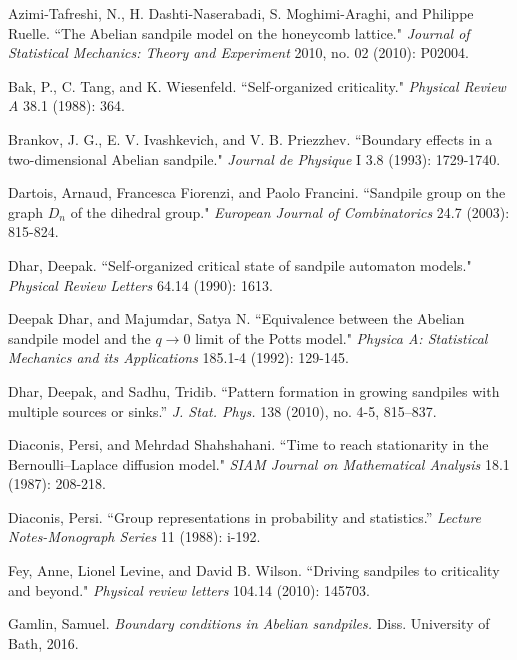 \documentclass[a4paper, 12pt, notitlepage]{amsart}
\theoremstyle{remark}
\begin{document}

\begin{thebibliography}{1}

Azimi-Tafreshi, N., H. Dashti-Naserabadi, S. Moghimi-Araghi, and Philippe Ruelle. 
\newblock ``The Abelian sandpile model on the honeycomb lattice." 
\newblock \emph{Journal of Statistical Mechanics: Theory and Experiment} 2010, no. 02 (2010): P02004.

Bak, P., C. Tang, and K. Wiesenfeld. 
\newblock ``Self-organized criticality." 
\newblock \emph{Physical Review A} 38.1 (1988): 364.

Brankov, J. G., E. V. Ivashkevich, and V. B. Priezzhev. 
\newblock ``Boundary effects in a two-dimensional Abelian sandpile." 
\newblock \emph{Journal de Physique} I 3.8 (1993): 1729-1740.

Dartois, Arnaud, Francesca Fiorenzi, and Paolo Francini.
\newblock ``Sandpile group on the graph $D_n$ of the dihedral group." 
\newblock \emph{European Journal of Combinatorics} 24.7 (2003): 815-824.


Dhar, Deepak. 
\newblock ``Self-organized critical state of sandpile automaton models." 
\newblock \emph{Physical Review Letters} 64.14 (1990): 1613.


Deepak Dhar, and Majumdar, Satya N. 
\newblock ``Equivalence between the Abelian sandpile model and the $q\to 0$ limit of the Potts model." 
\newblock \emph{Physica A: Statistical Mechanics and its Applications} 185.1-4 (1992): 129-145.


Dhar, Deepak, and Sadhu, Tridib. 
\newblock ``Pattern formation in growing sandpiles with multiple sources or sinks.'' \emph{J. Stat. Phys.} 138 (2010), no. 4-5, 815--837. 

Diaconis, Persi, and Mehrdad Shahshahani. 
\newblock ``Time to reach stationarity in the Bernoulli--Laplace diffusion model." 
\newblock \emph{SIAM Journal on Mathematical Analysis} 18.1 (1987): 208-218.

Diaconis, Persi. 
\newblock ``Group representations in probability and statistics.'' \emph{Lecture Notes-Monograph Series} 11 (1988): i-192.

Fey, Anne, Lionel Levine, and David B. Wilson.
\newblock ``Driving sandpiles to criticality and beyond." 
\newblock \emph{Physical review letters} 104.14 (2010): 145703.

Gamlin, Samuel. 
\newblock \emph{Boundary conditions in Abelian sandpiles.}
\newblock Diss. University of Bath, 2016.


\end{thebibliography}
\end{document}
